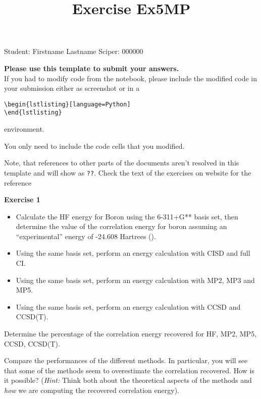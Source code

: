 \documentclass{article}
\title{Exercise Ex5MP}
\begin{document}
\maketitle\maketitle

Student:  Firstname Lastname    Sciper: 000000

\begin{mdframed}
\textbf{Please use this template to submit your answers.}\\
If you had to modify code from the notebook, please include the modified code in your submission either as screenshot or in a

\begin{verbatim}
\begin{lstlisting}[language=Python]
\end{lstlisting}
\end{verbatim}

environment.

You only need to include the code cells that you modified.

Note, that references to other parts of the documents aren't resolved in this template and will show as \texttt{??}. Check the text of the exercises on website for the reference
\end{mdframed}

\begin{mdframed}
\textbf{Exercise 1}\\
\begin{itemize}
\item Calculate the HF energy for Boron using the 6-311+G** basis set, then determine the value of the correlation energy for boron assuming an ``experimental'' energy of -24.608 Hartrees (\cite{Schaefer_1968}).
\item Using the same basis set, perform an energy calculation with CISD and full CI.
\item Using the same basis set, perform an energy calculation with MP2, MP3 and MP5.
\item Using the same basis set, perform an energy calculation with CCSD and CCSD(T).
\end{itemize}

Determine the percentage of the correlation energy recovered for HF, MP2, MP5, CCSD, CCSD(T).

Compare the performances of the different methods. In particular, you will see that some of the methods seem to overestimate the correlation recovered. How is it possible? (\textit{Hint:} Think both about the theoretical aspects of the methods and \textit{how} we are computing the recovered correlation energy).
\end{mdframed}
\end{document}
